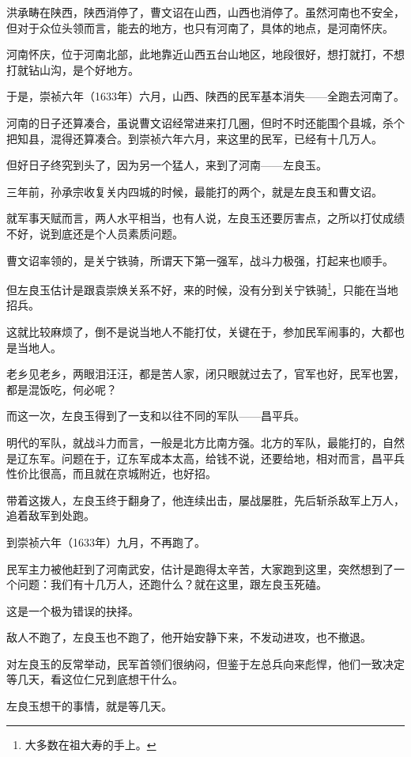 \begin{multicols}{\theparacolNo}
		洪承畴在陕西，陕西消停了，曹文诏在山西，山西也消停了。虽然河南也不安全，但对于众位头领而言，能去的地方，也只有河南了，具体的地点，是河南怀庆。

		河南怀庆，位于河南北部，此地靠近山西五台山地区，地段很好，想打就打，不想打就钻山沟，是个好地方。

		于是，崇祯六年（1633年）六月，山西、陕西的民军基本消失——全跑去河南了。

		河南的日子还算凑合，虽说曹文诏经常进来打几圈，但时不时还能围个县城，杀个把知县，混得还算凑合。到崇祯六年六月，来这里的民军，已经有十几万人。

		但好日子终究到头了，因为另一个猛人，来到了河南——左良玉。

		三年前，孙承宗收复关内四城的时候，最能打的两个，就是左良玉和曹文诏。

		就军事天赋而言，两人水平相当，也有人说，左良玉还要厉害点，之所以打仗成绩不好，说到底还是个人员素质问题。

		曹文诏率领的，是关宁铁骑，所谓天下第一强军，战斗力极强，打起来也顺手。

		但左良玉估计是跟袁崇焕关系不好，来的时候，没有分到关宁铁骑\footnote{大多数在祖大寿的手上。}，只能在当地招兵。

		这就比较麻烦了，倒不是说当地人不能打仗，关键在于，参加民军闹事的，大都也是当地人。

		老乡见老乡，两眼泪汪汪，都是苦人家，闭只眼就过去了，官军也好，民军也罢，都是混饭吃，何必呢？

		而这一次，左良玉得到了一支和以往不同的军队——昌平兵。

		明代的军队，就战斗力而言，一般是北方比南方强。北方的军队，最能打的，自然是辽东军。问题在于，辽东军成本太高，给钱不说，还要给地，相对而言，昌平兵性价比很高，而且就在京城附近，也好招。

		带着这拨人，左良玉终于翻身了，他连续出击，屡战屡胜，先后斩杀敌军上万人，追着敌军到处跑。

		到崇祯六年（1633年）九月，不再跑了。

		民军主力被他赶到了河南武安，估计是跑得太辛苦，大家跑到这里，突然想到了一个问题：我们有十几万人，还跑什么？就在这里，跟左良玉死磕。

		这是一个极为错误的抉择。

		敌人不跑了，左良玉也不跑了，他开始安静下来，不发动进攻，也不撤退。

		对左良玉的反常举动，民军首领们很纳闷，但鉴于左总兵向来彪悍，他们一致决定等几天，看这位仁兄到底想干什么。

		左良玉想干的事情，就是等几天。


\end{multicols}
